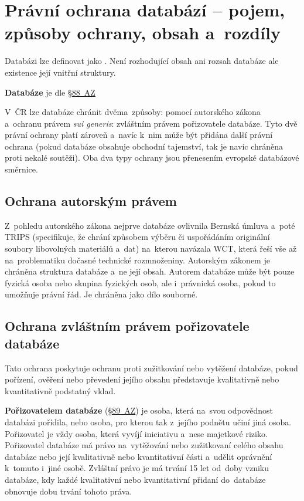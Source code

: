 \clearpage
\section{Právní ochrana databází -- pojem, způsoby ochrany, obsah a~rozdíly}

Databázi lze definovat jako \emph{}. Není rozhodující obsah ani rozsah databáze ale existence její vnitřní struktury.

\textbf{Databáze} je dle \href{https://www.zakonyprolidi.cz/cs/2000-121#p88}{§88~AZ} \emph{}

V~ČR lze databáze chránit dvěma~způsoby: pomocí autorského zákona a~ochranu právem \emph{sui generis}: zvláštním právem pořizovatele databáze. Tyto dvě právní ochrany platí zároveň a~navíc k~nim může být přidána další právní ochrana (pokud databáze obsahuje obchodní tajemství, tak je navíc chráněna proti nekalé soutěži). Oba dva typy ochrany jsou přenesením evropské databázové směrnice.

\subsection{Ochrana autorským právem}

Z~pohledu autorského zákona nejprve databáze ovlivnila Bernská úmluva a~poté TRIPS (specifikuje, že chrání způsobem výběru či uspořádáním originální soubory libovolných materiálů a~dat) na~kterou navázala WCT, která řeší vše až na~problematiku dočasné technické rozmnoženiny. Autorským zákonem je chráněna struktura databáze a~ne její obsah. Autorem databáze může být pouze fyzická osoba nebo skupina fyzických osob, ale i~právnická osoba, pokud to umožňuje právní řád. Je chráněna jako dílo souborné.

\subsection{Ochrana zvláštním právem pořizovatele databáze}

Tato ochrana poskytuje ochranu proti zužitkování nebo vytěžení databáze, pokud pořízení, ověření nebo převedení jejího obsahu představuje kvalitativně nebo kvantitativně podstatný vklad.

\textbf{Pořizovatelem databáze} (\href{https://www.zakonyprolidi.cz/cs/2000-121#p89}{§89~AZ}) je osoba, která na~svou odpovědnost databázi pořídila, nebo osoba, pro kterou tak z~jejího podnětu učiní jiná osoba. Pořizovatel je vždy osoba, která vyvíjí iniciativu a~nese majetkové riziko. Pořizovatel databáze má právo na~vytěžování nebo zužitkovaní celého obsahu databáze nebo její kvalitativně nebo kvantitativní části a~udělit oprávnění k~tomuto i~jiné osobě. Zvláštní právo je má trvání 15 let od~doby vzniku databáze, kdy každé kvalitativní nebo kvantitativní přidaní do~databáze obnovuje dobu trvání tohoto práva.

